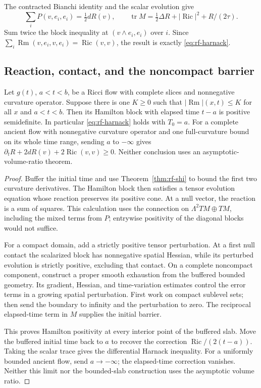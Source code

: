 The contracted Bianchi identity and the scalar evolution give
\[
 \sum_iP(v,e_i,e_i)=\tfrac12dR(v),\qquad
 \operatorname{tr}M=\tfrac12\Delta R+|\operatorname{Ric}|^2
                                      +R/(2\tau).
\]
Sum twice the block inequality at $(v\wedge e_i,e_i)$ over $i$.
Since $\sum_i\operatorname{Rm}(v,e_i,v,e_i)=\operatorname{Ric}(v,v)$,
the result is exactly \eqref{eq:rf-harnack}.

\subsection{Reaction, contact, and the noncompact barrier}

\begin{proposition}\label{prop:rf-bounded-harnack}
Let $g(t)$, $a<t<b$, be a Ricci flow with complete slices and
nonnegative curvature operator.  Suppose there is one $K\geq0$ such
that $|\operatorname{Rm}|(x,t)\leq K$ for all $x$ and $a<t<b$.
Then its Hamilton block with elapsed time $t-a$ is positive semidefinite.
In particular \eqref{eq:rf-harnack} holds with $T_0=a$.
For a complete ancient flow with nonnegative curvature operator and
one full-curvature bound on its whole time range, sending $a$ to
$-\infty$ gives
$\partial_tR+2dR(v)+2\operatorname{Ric}(v,v)\geq0$.
Neither conclusion uses an asymptotic-volume-ratio theorem.
\end{proposition}

\begin{proof}
Buffer the initial time and use Theorem~\ref{thm:rf-shi} to bound the
first two curvature derivatives. The Hamilton block then satisfies
a tensor evolution equation whose reaction preserves its positive
cone. At a null vector, the reaction is a sum of squares. This
calculation uses the connection on $\Lambda^2TM\oplus TM$, including
the mixed terms from $P$; entrywise positivity of the diagonal blocks
would not suffice.

For a compact domain, add a strictly positive tensor perturbation.
At a first null contact the scalarized block has nonnegative spatial
Hessian, while its perturbed evolution is strictly positive, excluding
that contact. On a complete noncompact component, construct a proper
smooth exhaustion from the buffered bounded geometry. Its gradient,
Hessian, and time-variation estimates control the error terms in a
growing spatial perturbation. First work on compact sublevel sets;
then send the boundary to infinity and the perturbation to zero.
The reciprocal elapsed-time term in $M$ supplies the initial barrier.

This proves Hamilton positivity at every interior point of the
buffered slab. Move the buffered initial time back to $a$ to recover
the correction $\operatorname{Ric}/(2(t-a))$. Taking the scalar trace
gives the differential Harnack inequality. For a uniformly bounded
ancient flow, send $a\to-\infty$; the elapsed-time correction vanishes.
Neither this limit nor the bounded-slab construction uses the
asymptotic volume ratio.
\end{proof}

